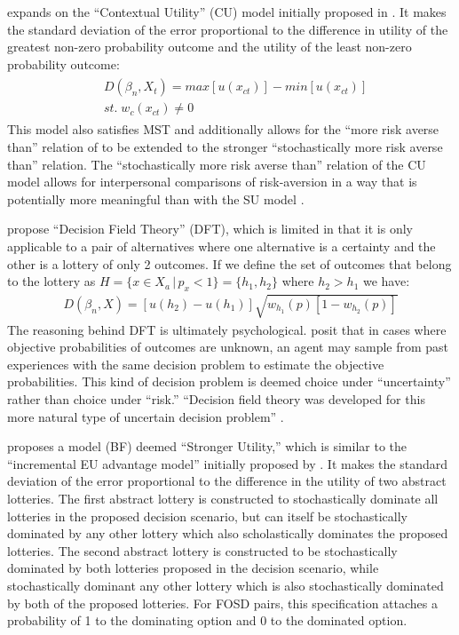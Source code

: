 \documentclass[../main.tex]{subfiles}
\begin{document}
\textcite{Wilcox2011} expands on the \enquote{Contextual Utility} (CU) model initially proposed in \textcite{Wilcox2008}.
It makes the standard deviation of the error proportional to the difference in utility of the greatest non-zero probability outcome and the utility of the least non-zero probability outcome:
\begin{align*}
	\label{eq2:W.cu}
	\begin{split}
		&D(\beta_n,X_t) = \mathit{max}[u(x_{ct})] - \mathit{min}[u(x_{ct})]\\
		&\mathit{st.}\; w_c(x_{ct}) \neq 0
	\end{split}
\end{align*}
This model also satisfies MST and additionally allows for the \enquote{more risk averse than} relation of \textcite{Pratt1964} to be extended to the stronger \enquote{stochastically more risk averse than} relation.
The \enquote{stochastically more risk averse than} relation of the CU model allows for interpersonal comparisons of risk-aversion in a way that is potentially more meaningful than with the SU model \parencite*[221]{Wilcox2008}.

\textcite{Busemeyer1993} propose \enquote{Decision Field Theory} (DFT), which is limited in that it is only applicable to a pair of alternatives where one alternative is a certainty and the other is a lottery of only 2 outcomes.
If we define the set of outcomes that belong to the lottery as $H = \{x \in X_a \,|\, p_x < 1\} = \{h_1,h_2\}$ where $h_2 > h_1$ we have:
\begin{align*}
	D(\beta_n,X) = \left[ u(h_2) - u(h_1) \right] \sqrt{w_{h_1}(p)[1-w_{h_2}(p)]}
\end{align*}
The reasoning behind DFT is ultimately psychological.
\textcite{Busemeyer1993} posit that in cases where objective probabilities of outcomes are unknown, an agent may sample from past experiences with the same decision problem to estimate the objective probabilities.
This kind of decision problem is deemed choice under \enquote{uncertainty} rather than choice under \enquote{risk.}
\enquote{Decision field theory was developed for this more natural type of uncertain decision problem} \parencite*[436]{Busemeyer1993}.

\textcite{Blavatskyy2014} proposes a model (BF) deemed \enquote{Stronger Utility,} which is similar to the \enquote{incremental EU advantage model} initially proposed by \textcite{Fishburn1987}.
It makes the standard deviation of the error proportional to the difference in the utility of two abstract lotteries.
The first abstract lottery is constructed to stochastically dominate all lotteries in the proposed decision scenario, but can itself be stochastically dominated by any other lottery which also scholastically dominates the proposed lotteries.
The second abstract lottery is constructed to be stochastically dominated by both lotteries proposed in the decision scenario, while stochastically dominant any other lottery which is also stochastically dominated by both of the proposed lotteries.
For FOSD pairs, this specification attaches a probability of 1 to the dominating option and 0 to the dominated  option.
\end{document}
